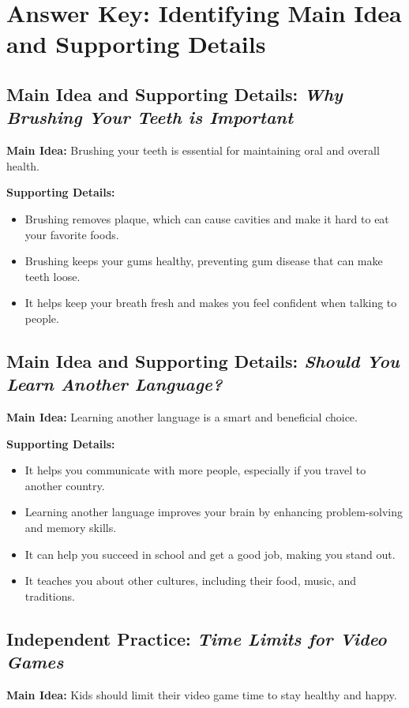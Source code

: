 \documentclass[12pt]{article}
\begin{document}
\section*{Answer Key: Identifying Main Idea and Supporting Details}

\subsection*{Main Idea and Supporting Details: \textit{Why Brushing Your Teeth is Important}}
\textbf{Main Idea:} Brushing your teeth is essential for maintaining oral and overall health.

\textbf{Supporting Details:}
\begin{itemize}
    \item Brushing removes plaque, which can cause cavities and make it hard to eat your favorite foods.
    \item Brushing keeps your gums healthy, preventing gum disease that can make teeth loose.
    \item It helps keep your breath fresh and makes you feel confident when talking to people.
\end{itemize}

\subsection*{Main Idea and Supporting Details: \textit{Should You Learn Another Language?}}
\textbf{Main Idea:} Learning another language is a smart and beneficial choice.

\textbf{Supporting Details:}
\begin{itemize}
    \item It helps you communicate with more people, especially if you travel to another country.
    \item Learning another language improves your brain by enhancing problem-solving and memory skills.
    \item It can help you succeed in school and get a good job, making you stand out.
    \item It teaches you about other cultures, including their food, music, and traditions.
\end{itemize}

\subsection*{Independent Practice: \textit{Time Limits for Video Games}}
\textbf{Main Idea:} Kids should limit their video game time to stay healthy and happy.
\end{document}
